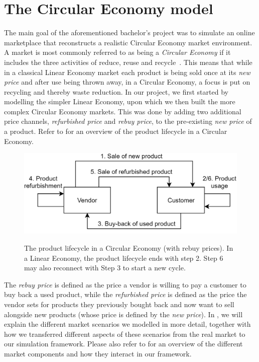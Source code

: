 \clearpage
\section{The Circular Economy model}\label{sec:CircularEconomy}

The main goal of the aforementioned bachelor's project was to simulate an online marketplace that reconstructs a realistic Circular Economy market environment. A market is most commonly referred to as being a \emph{Circular Economy} if it includes the three activities of reduce, reuse and recycle~\cite{circularEconomyDefinition}. This means that while in a classical Linear Economy market each product is being sold once at its \emph{new price} and after use being thrown away, in a Circular Economy, a focus is put on recycling and thereby waste reduction. In our project, we first started by modelling the simpler Linear Economy, upon which we then built the more complex Circular Economy markets. This was done by adding two additional price channels, \emph{refurbished price} and \emph{rebuy price}, to the pre-existing \emph{new price} of a product. Refer to  for an overview of the product lifecycle in a Circular Economy.

\begin{figure}[t]
	\centering
	\includegraphics[width = \textwidth]{images/product_lifecycle.png}\\
	\caption{The product lifecycle in a Circular Economy (with rebuy prices). In a Linear Economy, the product lifecycle ends with step 2. Step 6 may also reconnect with Step 3 to start a new cycle.\\ }\label{fig:IntroMarketDynamics}
\end{figure}

The \emph{rebuy price} is defined as the price a vendor is willing to pay a customer to buy back a used product, while the \emph{refurbished price} is defined as the price the vendor sets for products they previously bought back and now want to sell alongside new products (whose price is defined by the \emph{new price}). In , we will explain the different market scenarios we modelled in more detail, together with how we transferred different aspects of these scenarios from the real market to our simulation framework. Please also refer to  for an overview of the different market components and how they interact in our framework.

